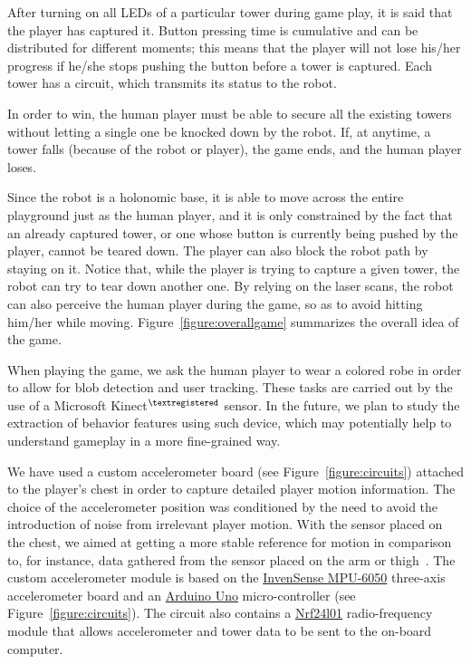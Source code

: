 {After turning on all LEDs of a particular tower during game play, it is said that the player has captured it. Button pressing time is cumulative and can be distributed for different moments; this means that the player will not lose his/her progress if he/she stops pushing the button before a tower is captured. Each tower has a circuit, which transmits its status to the robot. 

In order to win, the human player must be able to secure all the existing towers without letting a single one be knocked down by the robot. If, at anytime, a tower falls (because of the robot or player), the game ends, and the human player loses. 

Since the robot is a holonomic base, it is able to move across the entire playground just as the human player, and it is only constrained by the fact that an already captured tower, or one whose button is currently being pushed by the player, cannot be teared down. The player can also block the robot path by staying on it. Notice that, while the player is trying to capture a given tower, the robot can try to tear down another one. By relying on the laser scans, the robot can also perceive the human player during the game, so as to avoid hitting him/her while moving. Figure~\ref{figure:overallgame} summarizes the overall idea of the game.

When playing the game, we ask the human player to wear a colored robe in order to allow for blob detection and user tracking.  These tasks are carried out by the use of a Microsoft Kinect$^{\tiny{\textregistered}}$ sensor. In the future, we plan to study the extraction of behavior features using such device, which may potentially help to understand gameplay in a more fine-grained way.

We have used a custom accelerometer board (see Figure~\ref{figure:circuits}) attached to the player's chest in order to capture detailed player motion information. The choice of the accelerometer position was conditioned by the need to avoid the introduction of noise from irrelevant player motion. With the sensor placed on the chest, we aimed at getting a more stable reference for motion in comparison to, for instance, data gathered from the sensor placed on the arm or thigh~\cite{oliveira_activity_2017}. The custom accelerometer module is based on the \href{https://playground.arduino.cc/Main/MPU-6050}{InvenSense MPU-6050} three-axis accelerometer board and an \href{https://www.arduino.cc}{Arduino Uno} micro-controller (see Figure~\ref{figure:circuits}). The circuit also contains a \href{http://www.nordicsemi.com/eng/Products/2.4GHz-RF/nRF24L01}{Nrf24l01} radio-frequency module that allows accelerometer and tower data to be sent to the on-board computer.

}
